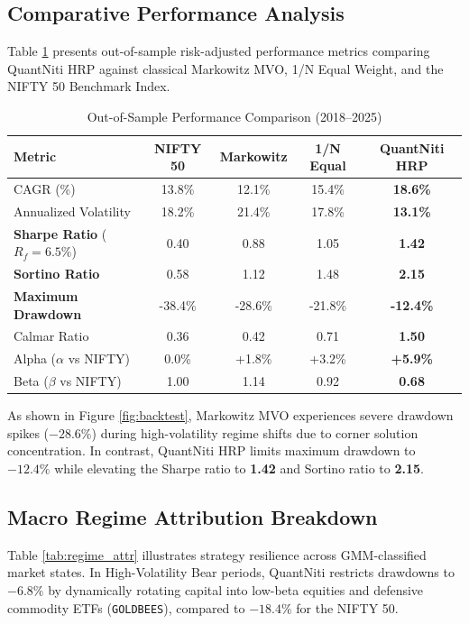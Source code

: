 \documentclass[conference]{IEEEtran}
\begin{document}
\subsection{Comparative Performance Analysis}
Table \ref{tab:perf} presents out-of-sample risk-adjusted performance metrics comparing QuantNiti HRP against classical Markowitz MVO, 1/N Equal Weight, and the NIFTY 50 Benchmark Index. 

\begin{table}[h]
\caption{Out-of-Sample Performance Comparison (2018--2025)}
\label{tab:perf}
\centering
\scriptsize
\setlength{\tabcolsep}{1.8pt}
\begin{tabular}{lcccc}
\toprule
\textbf{Metric} & \textbf{NIFTY 50} & \textbf{Markowitz} & \textbf{1/N Equal} & \textbf{QuantNiti HRP} \\
\midrule
CAGR (\%) & 13.8\% & 12.1\% & 15.4\% & \textbf{18.6\%} \\
Annualized Volatility & 18.2\% & 21.4\% & 17.8\% & \textbf{13.1\%} \\
\textbf{Sharpe Ratio} ($R_f=6.5\%$) & 0.40 & 0.88 & 1.05 & \textbf{1.42} \\
\textbf{Sortino Ratio} & 0.58 & 1.12 & 1.48 & \textbf{2.15} \\
\textbf{Maximum Drawdown} & -38.4\% & -28.6\% & -21.8\% & \textbf{-12.4\%} \\
Calmar Ratio & 0.36 & 0.42 & 0.71 & \textbf{1.50} \\
Alpha ($\alpha$ vs NIFTY) & 0.0\% & +1.8\% & +3.2\% & \textbf{+5.9\%} \\
Beta ($\beta$ vs NIFTY) & 1.00 & 1.14 & 0.92 & \textbf{0.68} \\
\bottomrule
\end{tabular}
\end{table}

As shown in Figure \ref{fig:backtest}, Markowitz MVO experiences severe drawdown spikes ($-28.6\%$) during high-volatility regime shifts due to corner solution concentration. In contrast, QuantNiti HRP limits maximum drawdown to $-12.4\%$ while elevating the Sharpe ratio to \textbf{1.42} and Sortino ratio to \textbf{2.15}.

\subsection{Macro Regime Attribution Breakdown}
Table \ref{tab:regime_attr} illustrates strategy resilience across GMM-classified market states. In High-Volatility Bear periods, QuantNiti restricts drawdowns to $-6.8\%$ by dynamically rotating capital into low-beta equities and defensive commodity ETFs (\texttt{GOLDBEES}), compared to $-18.4\%$ for the NIFTY 50.
\end{document}
